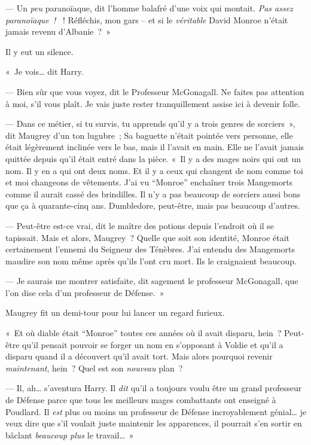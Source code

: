 --- Un \emph{peu} paranoïaque, dit l'homme balafré d'une voix qui montait. \emph{Pas assez paranoïaque~! }~! Réfléchis, mon gars -- et si le \emph{véritable} David Monroe n'était jamais revenu d'Albanie~?~»

Il y eut un silence.

«~Je vois… dit Harry.

--- Bien sûr que vous voyez, dit le Professeur McGonagall. Ne faites pas attention à moi, s'il vous plaît. Je vais juste rester tranquillement assise ici à devenir folle.

--- Dans ce métier, si tu survis, tu apprends qu'il y a trois genres de sorciers~», dit Maugrey d'un ton lugubre~; Sa baguette n'était pointée vers personne, elle était légèrement inclinée vers le bas, mais il l'avait en main. Elle ne l'avait jamais quittée depuis qu'il était entré dans la pièce. «~Il y a des mages noirs qui ont un nom. Il y en a qui ont deux noms. Et il y a ceux qui changent de nom comme toi et moi changeons de vêtements. J'ai vu “Monroe” enchaîner trois Mangemorts comme il aurait cassé des brindilles. Il n'y a pas beaucoup de sorciers aussi bons que ça à quarante-cinq ans. Dumbledore, peut-être, mais pas beaucoup d'autres.

--- Peut-être est-ce vrai, dit le maître des potions depuis l'endroit où il se tapissait. Mais et alors, Maugrey~? Quelle que soit son identité, Monroe était certainement l'ennemi du Seigneur des Ténèbres. J'ai entendu des Mangemorts maudire son nom même après qu'ils l'ont cru mort. Ils le craignaient beaucoup.

--- Je saurais me montrer satisfaite, dit sagement le professeur McGonagall, que l'on dise cela d'un professeur de Défense.~»

Maugrey fit un demi-tour pour lui lancer un regard furieux.

«~Et où diable était “Monroe” toutes ces années où il avait disparu, hein~? Peut-être qu'il pensait pouvoir se forger un nom en s'opposant à Voldie et qu'il a disparu quand il a découvert qu'il avait tort. Mais alors pourquoi revenir \emph{maintenant}, hein~? Quel est son \emph{nouveau} plan~?

--- Il, ah… s'aventura Harry. Il \emph{dit} qu'il a toujours voulu être un grand professeur de Défense parce que tous les meilleurs mages combattants ont enseigné à Poudlard. Il \emph{est} plus ou moins un professeur de Défense incroyablement génial… je veux dire que s'il voulait juste maintenir les apparences, il pourrait s'en sortir en bâclant \emph{beaucoup plus} le travail…~»

